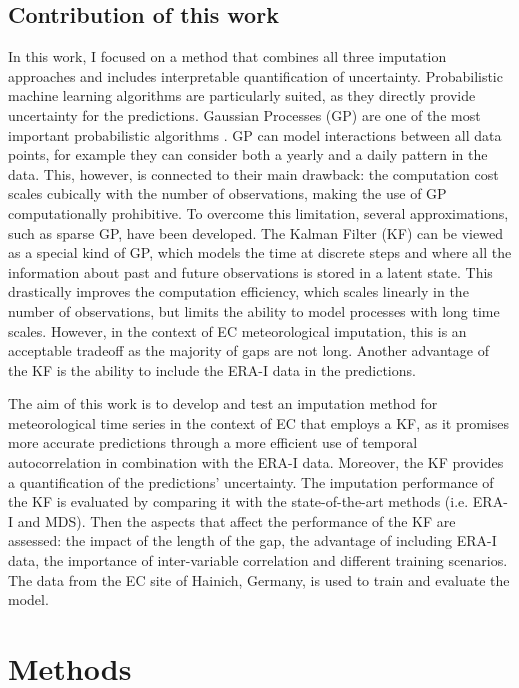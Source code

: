 \documentclass{article}
\let\Oldsection\section
\renewcommand{\section}{\FloatBarrier\Oldsection}
\let\Oldsubsection\subsection
\renewcommand{\subsection}{\FloatBarrier\Oldsubsection}
\begin{document}
\subsection{Contribution of this work}
In this work, I focused on a method that combines all three imputation approaches and includes interpretable quantification of uncertainty. Probabilistic machine learning algorithms are particularly suited, as they directly provide uncertainty for the predictions.
Gaussian Processes (GP) are one of the most important probabilistic algorithms \cite{2020_hennig_pml}. GP can model interactions between all data points, for example they can consider both a yearly and a daily pattern in the data. This, however, is connected to their main drawback: the computation cost scales cubically with the number of observations, making the use of GP computationally prohibitive. To overcome this limitation, several approximations, such as sparse GP, have been developed. 
The Kalman Filter (KF) can be viewed as a special kind of GP, which models the time at discrete steps and where all the information about past and future observations is stored in a latent state. This drastically improves the computation efficiency, which scales linearly in the number of observations, but limits the ability to model processes with long time scales. However, in the context of EC meteorological imputation, this is an acceptable tradeoff as the majority of gaps are not long. Another advantage of the KF is the ability to include the ERA-I data in the predictions.

The aim of this work is to develop and test an imputation method for meteorological time series in the context of EC that employs a KF, as it promises more accurate predictions through a more efficient use of temporal autocorrelation in combination with the ERA-I data. Moreover, the KF provides a quantification of the predictions' uncertainty.
The imputation performance of the KF is evaluated by comparing it with the state-of-the-art methods (i.e. ERA-I and MDS). Then the aspects that affect the performance of the KF are assessed: the impact of the length of the gap, the advantage of including ERA-I data, the importance of inter-variable correlation and different training scenarios. The data from the EC site of Hainich, Germany, is used to train and evaluate the model.


\section{Methods}
\end{document}
